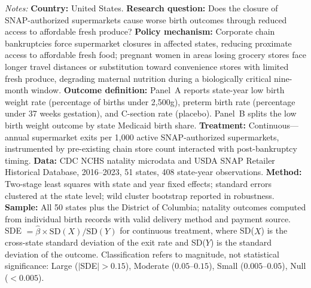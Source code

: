 \begin{table}[htbp]
\begin{threeparttable}
\begin{tablenotes}[flushleft]
\item \textit{Notes:} \textbf{Country:} United States. \textbf{Research question:} Does the closure of SNAP-authorized supermarkets cause worse birth outcomes through reduced access to affordable fresh produce? \textbf{Policy mechanism:} Corporate chain bankruptcies force supermarket closures in affected states, reducing proximate access to affordable fresh food; pregnant women in areas losing grocery stores face longer travel distances or substitution toward convenience stores with limited fresh produce, degrading maternal nutrition during a biologically critical nine-month window. \textbf{Outcome definition:} Panel~A reports state-year low birth weight rate (percentage of births under 2,500g), preterm birth rate (percentage under 37 weeks gestation), and C-section rate (placebo). Panel~B splits the low birth weight outcome by state Medicaid birth share. \textbf{Treatment:} Continuous---annual supermarket exits per 1,000 active SNAP-authorized supermarkets, instrumented by pre-existing chain store count interacted with post-bankruptcy timing. \textbf{Data:} CDC NCHS natality microdata and USDA SNAP Retailer Historical Database, 2016--2023, 51 states, 408 state-year observations. \textbf{Method:} Two-stage least squares with state and year fixed effects; standard errors clustered at the state level; wild cluster bootstrap reported in robustness. \textbf{Sample:} All 50 states plus the District of Columbia; natality outcomes computed from individual birth records with valid delivery method and payment source. SDE $= \hat{\beta} \times \text{SD}(X) / \text{SD}(Y)$ for continuous treatment, where SD($X$) is the cross-state standard deviation of the exit rate and SD($Y$) is the standard deviation of the outcome. Classification refers to magnitude, not statistical significance: Large ($|$SDE$| > 0.15$), Moderate ($0.05$--$0.15$), Small ($0.005$--$0.05$), Null ($< 0.005$).
\end{tablenotes}
\end{threeparttable}
\end{table}
